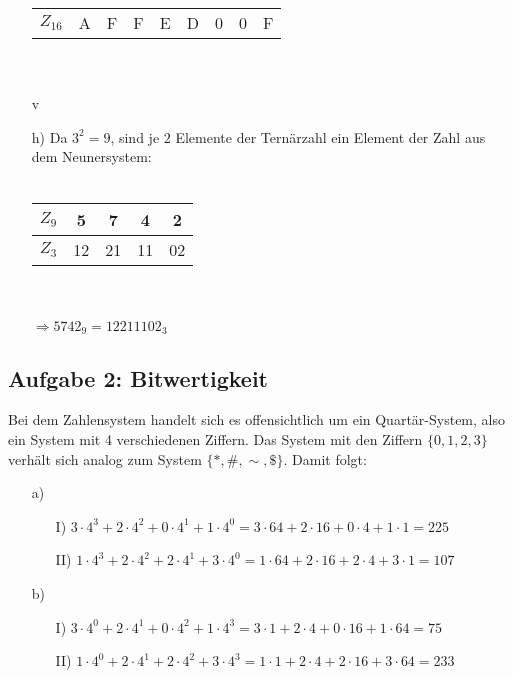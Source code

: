 \documentclass{article}
\begin{document}
\begin{itemize}
\begin{tabular}{l|cccccccc}
            \hline
            $Z_{16}$ & A    & F    & F    & E    & D    & 0    & 0    & F
        \end{tabular} \\\\
         v
        \item[h)] Da $3^2 = 9$, sind je $2$ Elemente der Ternärzahl ein Element der Zahl aus dem Neunersystem:\\\\
        \begin{tabular}{l|cccc} 
            $Z_{9}$ & 5  & 7  & 4  & 2 \\
            \hline
            $Z_{3}$ & 12 & 21 & 11 & 02
        \end{tabular} \\\\
        $\Rightarrow 5742_{9} = 12211102_3$
    \end{itemize}


    \subsection*{Aufgabe 2: Bitwertigkeit}
    Bei dem Zahlensystem handelt sich es offensichtlich um ein Quartär-System, also ein System mit 4 verschiedenen Ziffern. Das System mit den Ziffern $\{0, 1, 2, 3\}$ verhält sich analog zum System $\{*, \#, \sim, \$\}$. Damit folgt:
    \begin{enumerate}
        \item[a)]
        \begin{enumerate}
            \item[I)] $3 \cdot 4^3 + 2 \cdot 4^2 + 0 \cdot 4^1 + 1 \cdot 4^0 = 3\cdot 64 + 2\cdot 16 + 0 \cdot 4 + 1 \cdot 1 = 225$
            \item[II)] $1 \cdot 4^3 + 2 \cdot 4^2 + 2 \cdot 4^1 + 3 \cdot 4^0 = 1\cdot 64 + 2\cdot 16 + 2 \cdot 4 + 3 \cdot 1 = 107$
        \end{enumerate}
        \item[b)]
        \begin{enumerate}
            \item[I)] $3 \cdot 4^0 + 2 \cdot 4^1 + 0 \cdot 4^2 + 1 \cdot 4^3 = 3 \cdot 1 + 2\cdot 4 + 0 \cdot 16 + 1 \cdot 64 = 75$
            \item[II)] $1 \cdot 4^0 + 2 \cdot 4^1 + 2 \cdot 4^2 + 3 \cdot 4^3 = 1 \cdot 1 + 2\cdot 4 + 2 \cdot 16 + 3 \cdot 64 = 233$
        \end{enumerate}
    \end{enumerate}
\end{document}
